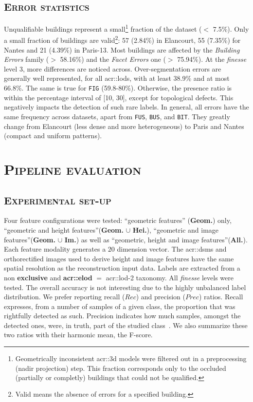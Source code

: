     \subsection{\textsc{Error statistics}}
        Unqualifiable buildings represent a small\footnote{
            Geometrically inconsistent \gls{acr::3d} models were filtered out in a preprocessing (nadir projection) step.
            This fraction corresponds only to the occluded (partially or completly) buildings that could not be qualified.
        } fraction of the dataset ($<$ 7.5\%).
        Only a small fraction of buildings are valid\footnote{
            Valid means the absence of errors for a specified building.
        }:
        57 (2.84\%) in Elancourt, 55 (7.35\%) for Nantes and 21 (4.39\%) in Paris-13.
        Most buildings are affected by the \textit{Building Errors} family ($>$ 58.16\%) and the \textit{Facet Errors} one ($>$ 75.94\%).
        At the \textit{finesse} level 3, more differences are noticed across.
        Over-segmentation errors are generally well represented, for all \gls{acr::lod}s, with at least 38.9\% and at most 66.8\%.
        The same is true for \texttt{FIG} (59.8-80\%).
        Otherwise, the presence ratio is within the percentage interval of [10, 30], except for topological defects.
        This negatively impacts the detection of such rare labels.
        In general, all errors have the same frequency across datasets, apart from \texttt{FUS}, \texttt{BUS}, and \texttt{BIT}.
        They greatly change from Elancourt (less dense and more heterogeneous) to Paris and Nantes (compact and uniform patterns).

\section{\textsc{Pipeline evaluation}}
    \subsection{\textsc{Experimental set-up}}
        Four feature configurations were tested: ``geometric features'' (\textbf{Geom.}) only, ``geometric and height features''(\textbf{Geom.} $\cup$ \textbf{Hei.}), ``geometric and image features''(\textbf{Geom.} $\cup$ \textbf{Im.}) as well as ``geometric, height and image features''(\textbf{All.}).
        Each feature modality generates a $20$ dimension vector.
        The \gls{acr::dsm}s and orthorectified images used to derive height and image features have the same spatial resolution as the reconstruction input data.
        Labels are extracted from a non \textbf{exclusive} and \textbf{\gls{acr::elod}} $=$ \gls{acr::lod}-2 taxonomy.
        All \textit{finesse} levels were tested. The overall accuracy is not interesting due to the highly unbalanced label distribution.
        We prefer reporting recall ($Rec$) and precision ($Prec$) ratios.
        Recall expresses, from a number of samples of a given class, the proportion that was rightfully detected as such.
        Precision indicates how much samples, amongst the detected ones, were, in truth, part of the studied class~\parencite{powers2011evaluation}.
        We also summarize these two ratios with their harmonic mean, the F-score.

